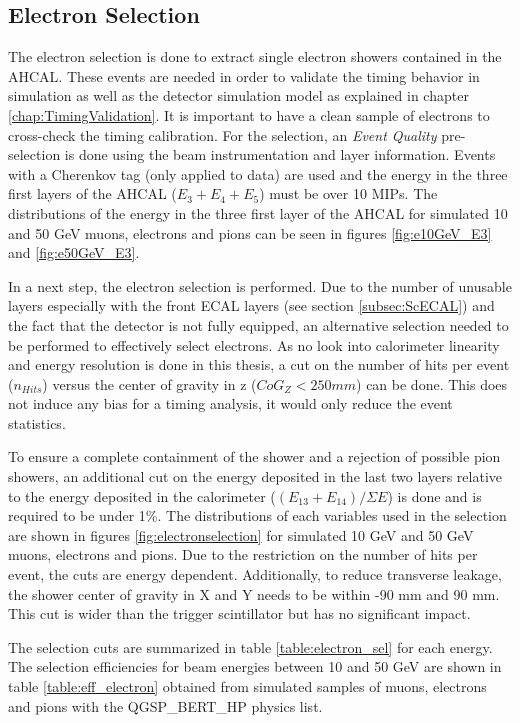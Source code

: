 \subsection{Electron Selection}
\label{subsec:elec_sel}

The electron selection is done to extract single electron showers contained in the AHCAL. These events are needed in order to validate the timing behavior in simulation as well as the detector simulation model as explained in chapter \ref{chap:TimingValidation}. It is important to have a clean sample of electrons to cross-check the timing calibration. For the selection, an \textit{Event Quality} pre-selection is done using the beam instrumentation and layer information. Events with a Cherenkov tag (only applied to data) are used and the energy in the three first layers of the AHCAL ($E_3+E_4+E_5$) must be over 10 MIPs. The distributions of the energy in the three first layer of the AHCAL for simulated 10 and 50 GeV muons, electrons and pions can be seen in figures \ref{fig:e10GeV_E3} and \ref{fig:e50GeV_E3}.

In a next step, the electron selection is performed. Due to the number of unusable layers especially with the front ECAL layers (see section \ref{subsec:ScECAL}) and the fact that the detector is not fully equipped, an alternative selection needed to be performed to effectively select electrons. As no look into calorimeter linearity and energy resolution is done in this thesis, a cut on the number of hits per event ($n_{Hits}$) versus the center of gravity in z ($CoG_Z < 250 mm$) can be done. This does not induce any bias for a timing analysis, it would only reduce the event statistics.

To ensure a complete containment of the shower and a rejection of possible pion showers, an additional cut on the energy deposited in the last two layers relative to the energy deposited in the calorimeter ($(E_{13}+E_{14})/\Sigma E$) is done and is required to be under 1\%. The distributions of each variables used in the selection are shown in figures \ref{fig:electronselection} for simulated 10 GeV and 50 GeV muons, electrons and pions. Due to the restriction on the number of hits per event, the cuts are energy dependent. Additionally, to reduce transverse leakage, the shower center of gravity in X and Y needs to be within -90 mm and 90 mm. This cut is wider than the trigger scintillator but has no significant impact.

The selection cuts are summarized in table \ref{table:electron_sel} for each energy. The selection efficiencies for beam energies between 10 and 50 GeV are shown in table \ref{table:eff_electron} obtained from simulated samples of muons, electrons and pions with the QGSP\_BERT\_HP physics list.

